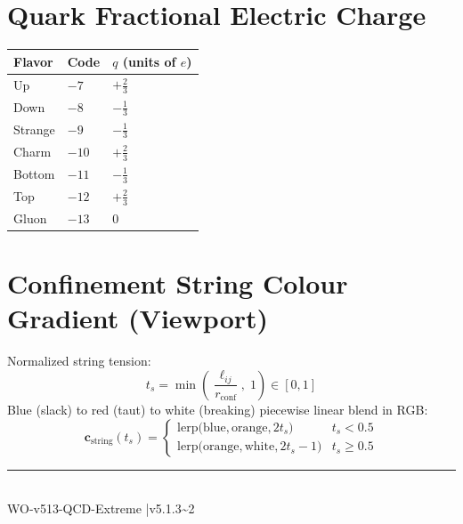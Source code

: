 \documentclass[10pt, a4paper, oneside]{article}
\begin{document}
\section{Quark Fractional Electric Charge}

\begin{center}
\begin{tabular}{lll}
\toprule
Flavor & Code & $q$ (units of $e$) \\
\midrule
Up & $-7$ & $+\tfrac{2}{3}$ \\
Down & $-8$ & $-\tfrac{1}{3}$ \\
Strange & $-9$ & $-\tfrac{1}{3}$ \\
Charm & $-10$ & $+\tfrac{2}{3}$ \\
Bottom & $-11$ & $-\tfrac{1}{3}$ \\
Top & $-12$ & $+\tfrac{2}{3}$ \\
Gluon & $-13$ & $0$ \\
\bottomrule
\end{tabular}
\end{center}

\section{Confinement String Colour Gradient (Viewport)}

Normalized string tension:
\begin{equation}
  t_s = \min\!\left(\frac{\ell_{ij}}{r_{\mathrm{conf}}},\;1\right) \in [0,1]
\end{equation}
Blue (slack) to red (taut) to white (breaking) piecewise linear blend in RGB:
\begin{equation}
  \mathbf{c}_{\mathrm{string}}(t_s) =
  \begin{cases}
    \mathrm{lerp}\bigl(\text{blue}, \text{orange}, 2t_s\bigr) & t_s < 0.5 \\
    \mathrm{lerp}\bigl(\text{orange}, \text{white}, 2t_s-1\bigr) & t_s \geq 0.5
  \end{cases}
\end{equation}

\vfill
\begin{center}
  \rule{0.4\linewidth}{0.4pt}\\[0.5em]
  \small WO-v513-QCD-Extreme \quad|\quad v5.1.3{\textasciitilde}2
\end{center}
\end{document}
